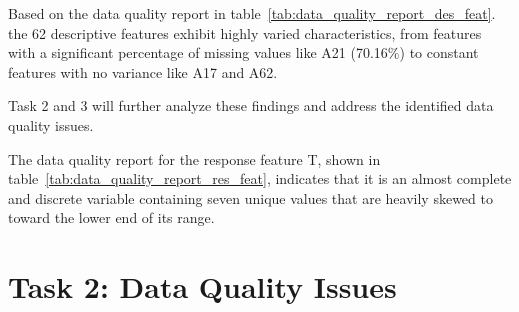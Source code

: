 \documentclass[11pt]{report}
\begin{document}
Based on the data quality report in table~\ref{tab:data_quality_report_des_feat}. the 62 descriptive features exhibit highly varied characteristics,
from features with a significant percentage of missing values like A21 (70.16\%) to constant features with no variance like A17 and A62.

Task 2 and 3 will further analyze these findings and address the identified data quality issues.

\begin{table}[H]
\centering
\caption{Data Quality Report for the Response Feature.}
\label{tab:data_quality_report_res_feat}
\end{table}

The data quality report for the response feature T, shown in table~\ref{tab:data_quality_report_res_feat}, indicates that it is an almost complete and discrete variable containing seven unique values
that are heavily skewed to toward the lower end of its range.


\section*{Task 2: Data Quality Issues}
\end{document}

